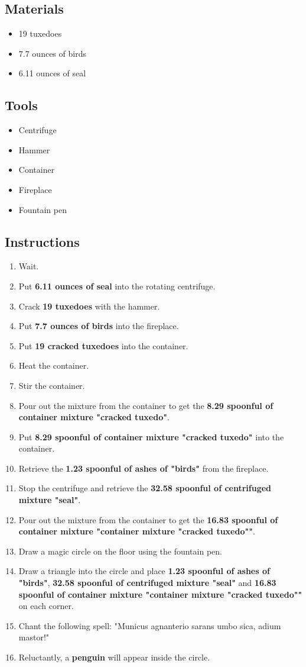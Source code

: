 \documentclass{article}
\begin{document}
\subsection{Materials}\begin{itemize}
\item 
19 tuxedoes
\item 
7.7 ounces of birds
\item 
6.11 ounces of seal
\end{itemize}
\subsection{Tools}\begin{itemize}
\item 
Centrifuge
\item 
Hammer
\item 
Container
\item 
Fireplace
\item 
Fountain pen
\end{itemize}
\subsection{Instructions}\begin{enumerate}
\item 
Wait.
\item 
Put \textbf{6.11 ounces of seal} into the rotating centrifuge.
\item 
Crack \textbf{19 tuxedoes} with the hammer.
\item 
Put \textbf{7.7 ounces of birds} into the fireplace.
\item 
Put \textbf{19 cracked tuxedoes} into the container.
\item 
Heat the container.
\item 
Stir the container.
\item 
Pour out the mixture from the container to get the \textbf{8.29 spoonful of container mixture "cracked tuxedo"}.
\item 
Put \textbf{8.29 spoonful of container mixture "cracked tuxedo"} into the container.
\item 
Retrieve the \textbf{1.23 spoonful of ashes of "birds"} from the fireplace.
\item 
Stop the centrifuge and retrieve the \textbf{32.58 spoonful of centrifuged mixture "seal"}.
\item 
Pour out the mixture from the container to get the \textbf{16.83 spoonful of container mixture "container mixture "cracked tuxedo""}.
\item 
Draw a magic circle on the floor using the fountain pen.
\item 
Draw a triangle into the circle and place \textbf{1.23 spoonful of ashes of "birds"}, \textbf{32.58 spoonful of centrifuged mixture "seal"} and \textbf{16.83 spoonful of container mixture "container mixture "cracked tuxedo""} on each corner.
\item 
Chant the following spell: "Municus agnanterio sarans umbo sica, adium mastor!"
\item 
Reluctantly, a \textbf{penguin} will appear inside the circle.
\end{enumerate}
\newpage
\end{document}
